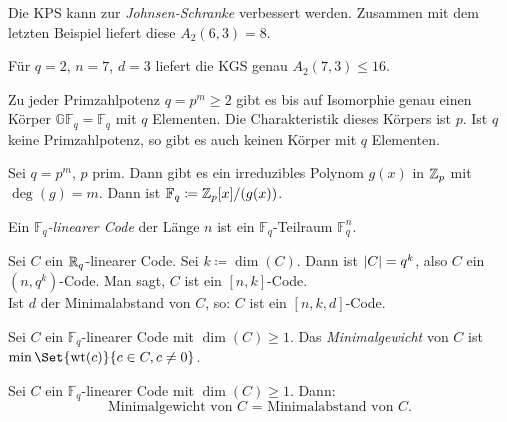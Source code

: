 \documentclass{cheat-sheet}
\newcommand{\F}{\mathbb{F}} %
\newcommand{\GF}{\mathbb{GF}} %
\DeclareMathOperator{\wt}{wt} %
\begin{document}
\begin{bem}
  Die KPS kann zur \emph{Johnsen-Schranke} verbessert werden.
  Zusammen mit dem letzten Beispiel liefert diese $A_2(6, 3) = 8$.
\end{bem}

\begin{bsp}
  Für $q{=}2$, $n{=}7$, $d{=}3$ liefert die KGS genau $A_2(7,3) \leq 16$.
\end{bsp}



\begin{bem}
  Zu jeder Primzahlpotenz $q = p^m \geq 2$ gibt es bis auf Isomorphie genau einen Körper $\GF_q = \F_q$ mit $q$ Elementen. Die Charakteristik dieses Körpers ist $p$. Ist $q$ keine Primzahlpotenz, so gibt es auch keinen Körper mit $q$ Elementen.
\end{bem}

\begin{konstr}
  Sei $q = p^m$, $p$ prim. Dann gibt es ein irreduzibles Polynom $g(x)$ in $\mathbb{Z}_p$ mit $\deg(g) = m$.
  Dann ist $\F_q \coloneqq \Z_p[x]/(g(x))$.
\end{konstr}



\begin{defn}
  Ein \emph{$\F_q$-linearer Code} der Länge $n$ ist ein $\F_q$-Teilraum $\F_q^n$.
\end{defn}

\begin{nota}
  Sei $C$ ein $\mathbb{R}_q$-linearer Code.
  Sei $k \coloneqq \dim(C)$.
  Dann ist $\lvert C\rvert = q^k$, also $C$ ein $(n, q^k)$-Code.
  Man sagt, $C$ ist ein $[n, k]$-Code. \\
  Ist $d$ der Minimalabstand von $C$, so: $C$ ist ein $[n,k,d]$-Code.
\end{nota}

\begin{defn}
  Sei $C$ ein $\F_q$-linearer Code mit $\dim(C) \geq 1$.
  Das \emph{Minimalgewicht} von $C$ ist $\min \Set{\wt(c)}{c \in C, c \neq 0}$.
\end{defn}

\begin{lem}
  Sei $C$ ein $\F_q$-linearer Code mit $\dim(C) \geq 1$.
  Dann:
  \[ \text{Minimalgewicht von $C$ = Minimalabstand von $C$.} \]
\end{lem}
\end{document}
